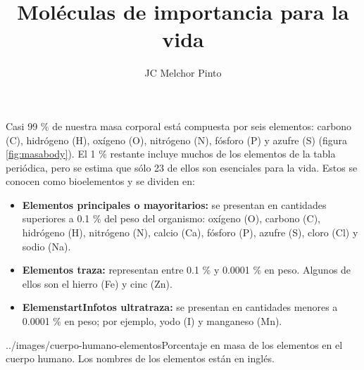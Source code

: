 \documentclass[12pt,addpoints,answers]{guia}
\title{Moléculas de importancia para la vida}
\author{JC Melchor Pinto}
\begin{document}
\pagestyle{headandfoot}

\INFO

\begin{startInfo}
    {
        Casi 99 \% de nuestra masa corporal está compuesta por seis elementos:
        carbono (C), hidrógeno (H), oxígeno (O), nitrógeno (N), fósforo
        (P) y azufre (S) (figura \ref{fig:masabody}). El 1  \% restante incluye muchos
        de los elementos de la tabla periódica, pero se estima que
        sólo 23 de ellos son esenciales para la vida. Estos se conocen
        como bioelementos y se dividen en:
        \begin{itemize}
            \item \textbf{Elementos principales o mayoritarios:} se presentan en cantidades superiores a 0.1 \% del peso del organismo: oxígeno (O),
                  carbono (C), hidrógeno (H), nitrógeno (N), calcio (Ca), fósforo
                  (P), azufre (S), cloro (Cl) y sodio (Na).
            \item \textbf{Elementos traza:} representan entre 0.1 \% y 0.0001 \% en peso.
                  Algunos de ellos son el hierro (Fe) y cinc (Zn).
            \item \textbf{ElemenstartInfotos ultratraza:} se presentan en cantidades menores a
                  0.0001 \% en peso; por ejemplo, yodo (I) y manganeso (Mn).
        \end{itemize}
    }{../images/cuerpo-humano-elementos}{Porcentaje en masa de los elementos
        en el cuerpo humano. Los nombres de los elementos están en inglés.}
\end{startInfo}
\end{document}
